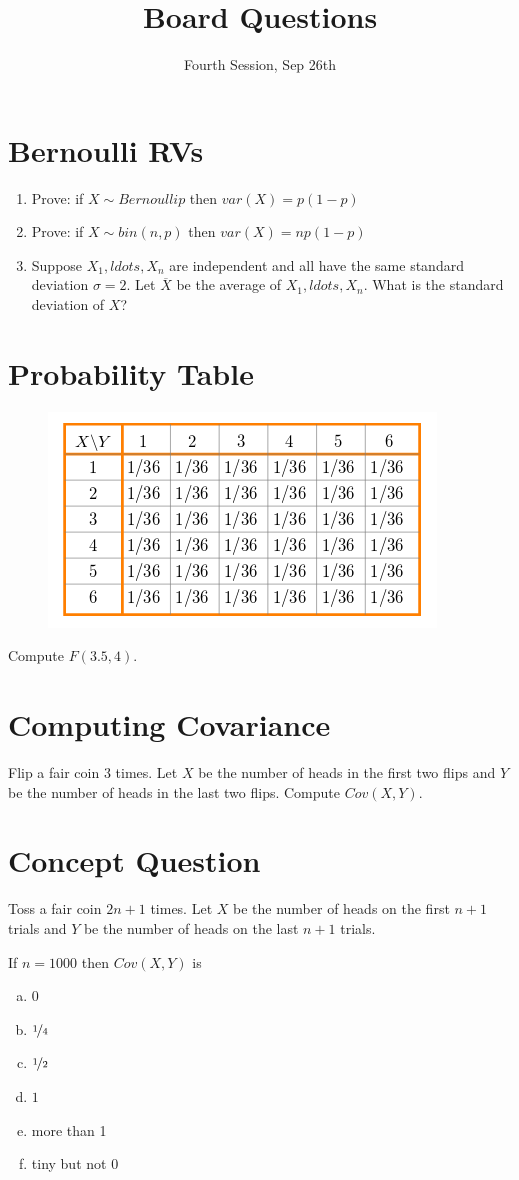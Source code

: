 \documentclass[11p,a4paper]{article}
\title{Board Questions}
\date{Fourth Session, Sep 26th}
\begin{document}
\maketitle

\section{Bernoulli RVs}
\begin{enumerate}
\item Prove: if $ X \sim Bernoulli p $ then $ var(X) = p(1-p) $
\item Prove: if $ X \sim bin(n,p) $ then $ var(X) = np(1-p) $
\item Suppose $ X_{1}, ldots, X_{n} $ are independent and all have the same 
standard deviation $ \sigma = 2 $. Let $ \overline{X} $ be the average of
$ X_{1}, ldots, X_{n} $. What is the standard deviation of $ X $?
\end{enumerate}

\section{Probability Table}
\begin{figure}[ht!]
\center
\includegraphics[scale=.6]{04-table.png} 
\end{figure}
Compute $ F(3.5,4) $.

\section{Computing Covariance}
Flip a fair coin 3 times. Let $ X $ be the number of heads in the first two flips and $ Y $ be
the number of heads in the last two flips. Compute $ Cov(X,Y) $.

\section{Concept Question}
Toss a fair coin $ 2n+1 $ times. Let $ X $ be the number of heads on the first $ n+1 $ trials and 
$ Y $ be the number of heads on the last $ n+1 $ trials.

If $ n=1000 $ then $ Cov(X,Y) $ is 
\begin{enumerate}[a)]
\item 0
\item $ \nicefrac{1}{4} $
\item $ \nicefrac{1}{2} $
\item $ 1 $
\item more than 1
\item tiny but not 0
\end{enumerate}
\end{document}

